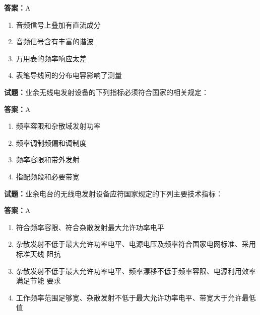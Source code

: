 \documentclass{ctexbook}
\begin{document}
\textbf{答案：}A 

\begin{enumerate}[leftmargin=3em]
  \item 音频信号上叠加有直流成分 

  \item 音频信号含有丰富的谐波 

  \item 万用表的频率响应太差 

  \item 表笔导线间的分布电容影响了测量 

\end{enumerate}





\vspace{1em}

\textbf{试题：}业余无线电发射设备的下列指标必须符合国家的相关规定： 

\textbf{答案：}A 

\begin{enumerate}[leftmargin=3em]
  \item 频率容限和杂散域发射功率 

  \item 频率调制频偏和调制度 

  \item 频率容限和带外发射 

  \item 指配频段和必要带宽 

\end{enumerate}






\vspace{1em}

\textbf{试题：}业余电台的无线电发射设备应符国家规定的下列主要技术指标： 

\textbf{答案：}A 

\begin{enumerate}[leftmargin=3em]
  \item 符合频率容限、符合杂散发射最大允许功率电平 

  \item 杂散发射不低于最大允许功率电平、电源电压及频率符合国家电网标准、采用标准天线
阻抗 

  \item 杂散发射不低于最大允许功率电平、频率漂移不低于频率容限、电源利用效率满足节能
要求 

  \item 工作频率范围足够宽、杂散发射不低于最大允许功率电平、带宽大于允许最低值 

\end{enumerate}
\end{document}
